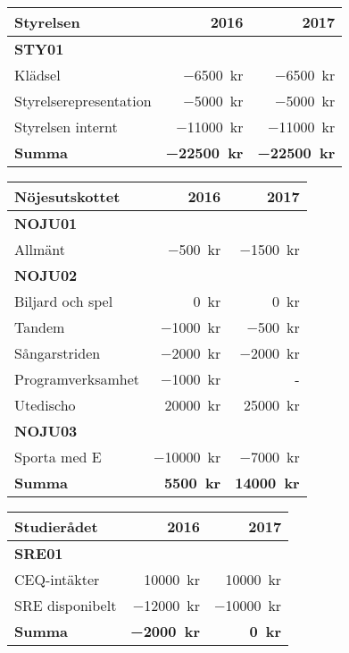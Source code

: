 \documentclass[10pt]{article}
\begin{document}
\begin{tabularx}{10cm}{X r r}
    \textbf{\large Styrelsen} & \textbf{2016} & \textbf{2017} \\
    \hline
    \textbf{STY01} \\
    Klädsel & \SI{-6500}{kr} & \SI{-6500}{kr} \\
    Styrelserepresentation & \SI{-5000}{kr} & \SI{-5000}{kr} \\
    Styrelsen internt & \SI{-11000}{kr} & \SI{-11000}{kr} \\
    \hline
    \textbf{Summa} & \textbf{\SI{-22500}{kr}} & \textbf{\SI{-22500}{kr}} \\
\end{tabularx}

\begin{tabularx}{10cm}{X r r}
    \textbf{\large Nöjesutskottet} & \textbf{2016} & \textbf{2017} \\
    \hline
    \textbf{NOJU01} \\
    Allmänt & \SI{-500}{kr} & \SI{-1500}{kr} \\
    \textbf{NOJU02} \\
    Biljard och spel & \SI{0}{kr} & \SI{0}{kr} \\
    Tandem & \SI{-1000}{kr} & \SI{-500}{kr} \\
    Sångarstriden & \SI{-2000}{kr} & \SI{-2000}{kr} \\
    Programverksamhet & \SI{-1000}{kr} & - \\
    Utedischo & \SI{20000}{kr} & \SI{25000}{kr} \\
    \textbf{NOJU03} \\
    Sporta med E & \SI{-10000}{kr} & \SI{-7000}{kr} \\
    \hline
    \textbf{Summa} & \textbf{\SI{5500}{kr}} & \textbf{\SI{14000}{kr}} \\
\end{tabularx}

\begin{tabularx}{10cm}{X r r}
    \textbf{\large Studierådet} & \textbf{2016} & \textbf{2017} \\
    \hline
    \textbf{SRE01} \\
    CEQ-intäkter & \SI{10000}{kr} & \SI{10000}{kr} \\
    SRE disponibelt & \SI{-12000}{kr} & \SI{-10000}{kr} \\
    \hline
    \textbf{Summa} & \textbf{\SI{-2000}{kr}} & \textbf{\SI{0}{kr}} \\
\end{tabularx}
\end{document}
